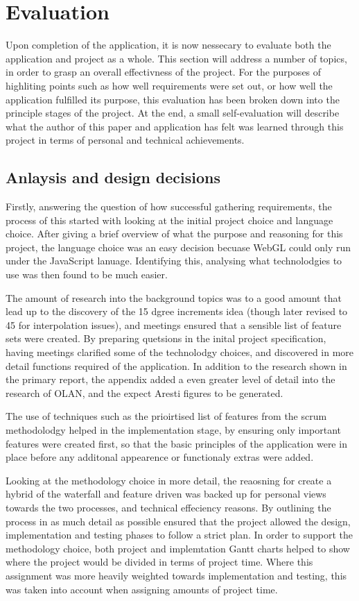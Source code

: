 \chapter{Evaluation}
Upon completion of the application, it is now nessecary to evaluate both the application and project as a whole. This section will address a number of topics, in order to grasp an overall effectivness of the project. For the purposes of highliting points such as how well requirements were set out, or how well the application fulfilled its purpose, this evaluation has been broken down into the principle stages of the project. At the end, a small self-evaluation will describe what the author of this paper and application has felt was learned through this project in terms of personal and technical achievements.

\section{Anlaysis and design decisions}
Firstly, answering the question of how successful gathering requirements, the process of this started with looking at the initial project choice and language choice. After giving a brief overview of what the purpose and reasoning for this project, the language choice was an easy decision becuase WebGL could only run under the JavaScript lanuage. Identifying this, analysing what technolodgies to use was then found to be much easier. 

The amount of research into the background topics was to a good amount that lead up to the discovery of the 15 dgree increments idea (though later revised to 45 for interpolation issues), and meetings ensured that a sensible list of feature sets were created. By preparing quetsions in the inital project specification, having meetings clarified some of the technolodgy choices, and discovered in more detail functions required of the application. In addition to the research shown in the primary report, the appendix added a even greater level of detail into the research of OLAN, and the expect Aresti figures to be generated.

The use of techniques such as the prioirtised list of features from the scrum methodolodgy helped in the implementation stage, by ensuring only important features were created first, so that the basic principles of the application were in place before any additonal appearence or functionaly extras were added.

Looking at the methodology choice in more detail, the reaosning for create a hybrid of the waterfall and feature driven was backed up for personal views towards the two processes, and technical effeciency reasons. By outlining the process in as much detail as possible ensured that the project allowed the design, implementation and testing phases to follow a strict plan. In order to support the methodology choice, both project and implemtation Gantt charts helped to show where the project would be divided in terms of project time. Where this assignment was more heavily weighted towards implementation and testing, this was taken into account when assigning amounts of project time.

